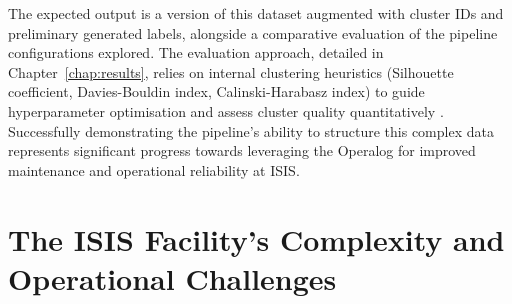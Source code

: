 \documentclass[10pt,oneside]{report}
\begin{document}
The expected output is a version of this dataset augmented with cluster IDs and preliminary generated labels, alongside a comparative evaluation of the pipeline configurations explored. The evaluation approach, detailed in Chapter~\ref{chap:results}, relies on internal clustering heuristics (Silhouette coefficient, Davies-Bouldin index, Calinski-Harabasz index) to guide hyperparameter optimisation and assess cluster quality quantitatively \cite{rousseeuw1987silhouettes, davies1979cluster, calinski1974dendrite}. Successfully demonstrating the pipeline's ability to structure this complex data represents significant progress towards leveraging the Operalog for improved maintenance and operational reliability at ISIS.



\section{The ISIS Facility's Complexity and Operational Challenges}\label{sec:isisbg}

\end{document}
